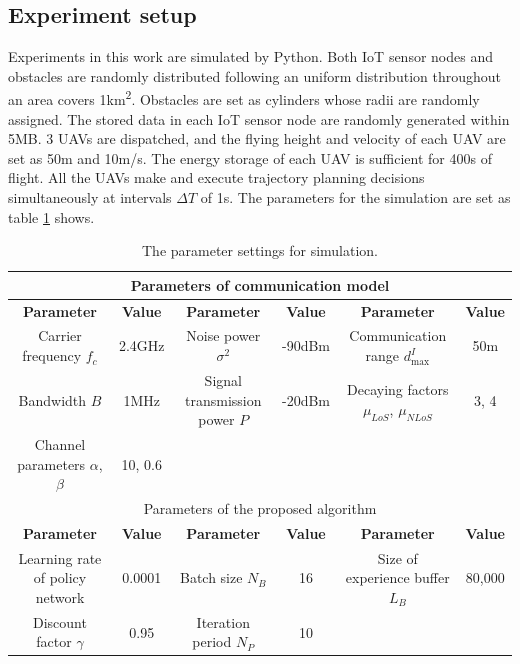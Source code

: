 \documentclass[journal]{IEEEtran}
\begin{document}
\subsection{Experiment setup}\label{exp_settings}
Experiments in this work are simulated by Python. Both IoT sensor nodes and obstacles are randomly distributed following an uniform distribution throughout an area covers 1km\textsuperscript{2}. Obstacles are set as cylinders whose radii are randomly assigned. The stored data in each IoT sensor node are randomly generated within 5MB. 3 UAVs are dispatched, and the flying height and velocity of each UAV are set as 50m and 10m/s. The energy storage of each UAV is sufficient for 400s of flight. All the UAVs make and execute trajectory planning decisions simultaneously at intervals $\Delta T$ of 1s. 
The parameters for the simulation are set as table \ref{parameters} shows. 
\begin{table}[tb]
	\renewcommand{\arraystretch}{1.3}
	\caption{The parameter settings for simulation.\label{parameters}}
	\centering
	\begin{tabular}{c|c|c|c|c|c}
		\hline \hline
        \multicolumn{6}{c}{Parameters of communication model} \\ \hline
		\textbf{Parameter} & \textbf{Value} & \textbf{Parameter} & \textbf{Value} & \textbf{Parameter} & \textbf{Value} \\ \hline
		Carrier frequency $f_c$ & 2.4GHz & Noise power $\sigma ^2$ & -90dBm & Communication range $d^{I}_{\max}$  & 50m\\ \hline
        Bandwidth $B$ & 1MHz & Signal transmission power $P$ & -20dBm & Decaying factors $\mu_{LoS}$, $\mu_{NLoS}$ & 3, 4 \\ \hline
		Channel parameters $\alpha$, $\beta$ & 10, 0.6 & & & & \\ \hline 
        \multicolumn{6}{c}{Parameters of the proposed algorithm} \\ \hline
        \textbf{Parameter} & \textbf{Value} & \textbf{Parameter} & \textbf{Value} & \textbf{Parameter} & \textbf{Value} \\ \hline
        Learning rate of policy network & 0.0001 & Batch size $N_B$ & 16 & Size of experience buffer $L_B$  & 80,000 \\ \hline
        Discount factor $\gamma$ & 0.95 & Iteration period $N_P$ & 10 & & \\ \hline \hline
	\end{tabular}
\end{table}
\end{document}
